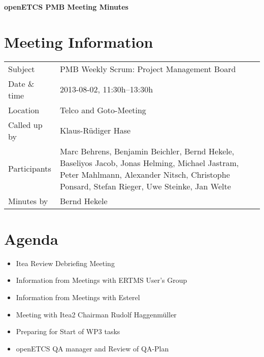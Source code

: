 \documentclass[a4paper, 11pt]{article}
\begin{document}
{\begin{center}\huge\bf openETCS PMB Meeting Minutes\end{center}}
\section{Meeting Information}

\renewcommand{\arraystretch}{1.5}
\begin{supertabular}{m{.2\textwidth}m{.8\textwidth}}
Subject & PMB Weekly Scrum: Project Management Board\\
Date \& time & 2013-08-02, 11:30h--13:30h\\
Location & Telco and Goto-Meeting\\
Called up by & Klaus-R\"udiger Hase\\
Participants &
Marc Behrens,
Benjamin Beichler,
Bernd Hekele,
Baseliyos Jacob,
Jonas Helming,
Michael Jastram,
Peter Mahlmann,
Alexander Nitsch,
Christophe Ponsard,
Stefan Rieger,
Uwe Steinke,
Jan Welte
\\

Minutes by & Bernd Hekele\\

\end{supertabular}
\renewcommand{\arraystretch}{1.0}


\section{{Agenda}}
\begin{itemize}
\item Itea Review Debriefing Meeting
\item Information from Meetings with ERTMS User's Group
\item Information from Meetings with Esterel
\item Meeting with Itea2 Chairman Rudolf Haggenm\"uller
\item Preparing for Start of WP3 tasks
\item openETCS QA manager and Review of QA-Plan
\end{itemize}
\end{document}
